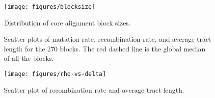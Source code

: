 \documentclass[english]{article}
\newcommand{\lyxdot}{.}
\begin{document}
\begin{figure}
\begin{center}
\texttt{[image: figures/blocksize]}
\end{center}
\vspace{-.3in}
\caption{Distribution of core alignment block sizes.}
\label{fig:blocksize}
\end{figure}
\clearpage{}%

\begin{figure}


\caption{\label{fig:scatter3}Scatter plots of mutation rate, recombination
rate, and average tract length for the 270 blocks. The red dashed
line is the global median of all the blocks.}
\end{figure}
\clearpage{}%

\begin{figure}
\begin{center}
\texttt{[image: figures/rho-vs-delta]}
\end{center}
\vspace{-.3in}
\caption{Scatter plot of recombination rate and average tract length.}
\label{fig:rhologdelta}
\end{figure}
\clearpage{}%
\end{document}
